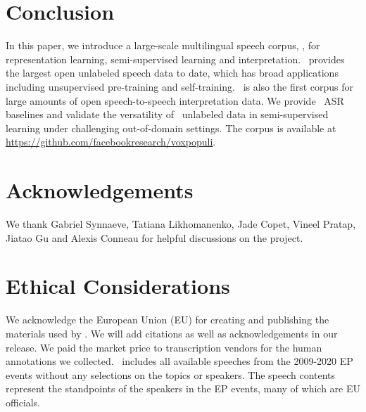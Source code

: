 \section{Conclusion}

In this paper, we introduce a large-scale multilingual speech corpus, \vp, for representation learning, semi-supervised learning and interpretation. \vp~provides the largest open unlabeled speech data to date, which has broad applications including unsupervised pre-training and self-training. \vp~is also the first corpus for large amounts of open speech-to-speech interpretation data.
We provide \vp~ASR baselines and validate the versatility of \vp~unlabeled data in semi-supervised learning under challenging out-of-domain settings. The corpus is available
at \url{https://github.com/facebookresearch/voxpopuli}.

\section{Acknowledgements}
We thank Gabriel Synnaeve, Tatiana Likhomanenko, Jade Copet, Vineel Pratap, Jiatao Gu and Alexis Conneau for helpful discussions on the project.

\section{Ethical Considerations}
We acknowledge the European Union (EU) for creating and publishing the materials used by \vp.
We will add citations as well as acknowledgements in our release.
We paid the market price to transcription vendors for the human annotations we collected. \vp~includes all available speeches from the 2009-2020 EP events without any selections on the topics or speakers. The speech contents represent the standpoints of the speakers in the EP events, many of which are EU officials.

